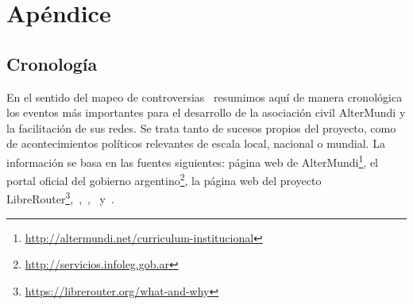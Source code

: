 \section*{Apéndice}

\subsection*{Cronología}

En el sentido del mapeo de controversias~\autocite{Venturini2010a} resumimos aquí de manera cronológica los eventos más importantes para el desarrollo de la asociación civil AlterMundi y la facilitación de sus redes.
Se trata tanto de sucesos propios del proyecto, como de acontecimientos políticos relevantes de escala local, nacional o mundial.
La información se basa en las fuentes siguientes: página web de AlterMundi\footnote{\url{http://altermundi.net/curriculum-institucional}}, el portal oficial del gobierno argentino\footnote{\url{http://servicios.infoleg.gob.ar}}, la página web del proyecto LibreRouter\footnote{\url{https://librerouter.org/what-and-why}},~\autocite{Piccoli2015},~\autocite{Brock2016},~\autocite{Vaseva2016a} y~\autocite{Wunderlich2017}.

